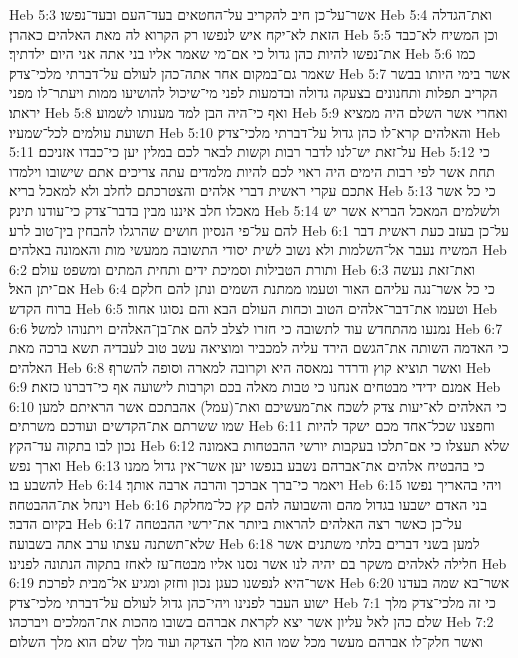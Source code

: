 Heb 5:3  אשר־על־כן חיב להקריב על־החטאים בעד־העם ובעד־נפשו׃
Heb 5:4  ואת־הגדלה הזאת לא־יקח איש לנפשו רק הקרוא לה מאת האלהים כאהרן׃
Heb 5:5  וכן המשיח לא־כבד את־נפשו להיות כהן גדול כי אם־מי שאמר אליו בני אתה אני היום ילדתיך׃
Heb 5:6  כמו שאמר גם־במקום אחר אתה־כהן לעולם על־דברתי מלכי־צדק׃
Heb 5:7  אשר בימי היותו בבשר הקריב תפלות ותחנונים בצעקה גדולה ובדמעות לפני מי־שיכול להושיעו ממות ויעתר־לו מפני יראתו׃
Heb 5:8  ואף כי־היה הבן למד מענותו לשמוע׃
Heb 5:9  ואחרי אשר השלם היה ממציא תשועת עולמים לכל־שמעיו׃
Heb 5:10  והאלהים קרא־לו כהן גדול על־דברתי מלכי־צדק׃
Heb 5:11  על־זאת יש־לנו לדבר רבות וקשות לבאר לכם במלין יען כי־כבדו אזניכם׃
Heb 5:12  כי תחת אשר לפי רבות הימים היה ראוי לכם להיות מלמדים עתה צריכים אתם שישובו וילמדו אתכם עקרי ראשית דברי אלהים והצטרכתם לחלב ולא למאכל בריא׃
Heb 5:13  כי כל אשר מאכלו חלב איננו מבין בדבר־צדק כי־עודנו תינק׃
Heb 5:14  ולשלמים המאכל הבריא אשר יש להם על־פי הנסיון חושים שהרגלו להבחין בין־טוב לרע׃
Heb 6:1  על־כן בעזב כעת ראשית דבר המשיח נעבר אל־השלמות ולא נשוב לשית יסודי התשובה ממעשי מות והאמונה באלהים׃
Heb 6:2  ותורת הטבילות וסמיכת ידים ותחית המתים ומשפט עולם׃
Heb 6:3  ואת־זאת נעשה אם־יתן האל׃
Heb 6:4  כי כל אשר־נגה עליהם האור וטעמו ממתנת השמים ונתן להם חלקם ברוח הקדש׃
Heb 6:5  וטעמו את־דבר־אלהים הטוב וכחות העולם הבא והם נסוגו אחור׃
Heb 6:6  נמנעו מהתחדש עוד לתשובה כי חזרו לצלב להם את־בן־האלהים ויתנוהו למשל׃
Heb 6:7  כי האדמה השותה את־הגשם הירד עליה למכביר ומוציאה עשב טוב לעבדיה תשא ברכה מאת האלהים׃
Heb 6:8  ואשר תוציא קוץ ודרדר נמאסה היא וקרובה למארה וסופה להשרף׃
Heb 6:9  אמנם ידידי מבטחים אנחנו כי טבות מאלה בכם וקרבות לישועה אף כי־דברנו כזאת׃
Heb 6:10  כי האלהים לא־יעות צדק לשכח את־מעשיכם ואת־(עמל) אהבתכם אשר הראיתם למען שמו ששרתם את־הקדשים ועודכם משרתים׃
Heb 6:11  וחפצנו שכל־אחד מכם ישקד להיות נכון לבו בתקוה עד־הקץ׃
Heb 6:12  שלא תעצלו כי אם־תלכו בעקבות יורשי ההבטחות באמונה וארך נפש׃
Heb 6:13  כי בהבטיח אלהים את־אברהם נשבע בנפשו יען אשר־אין גדול ממנו להשבע בו׃
Heb 6:14  ויאמר כי־ברך אברכך והרבה ארבה אותך׃
Heb 6:15  ויהי בהאריך נפשו וינחל את־ההבטחה׃
Heb 6:16  בני האדם ישבעו בגדול מהם והשבועה להם קץ כל־מחלקת בקיום הדבר׃
Heb 6:17  על־כן כאשר רצה האלהים להראות ביותר את־ירשי ההבטחה שלא־תשתנה עצתו ערב אתה בשבועה׃
Heb 6:18  למען בשני דברים בלתי משתנים אשר חלילה לאלהים משקר בם יהיה לנו אשר נסנו אליו מבטח־עז לאחז בתקוה הנתונה לפנינו׃
Heb 6:19  אשר־היא לנפשנו כעגן נכון וחזק ומגיע אל־מבית לפרכת׃
Heb 6:20  אשר־בא שמה בעדנו ישוע העבר לפנינו ויהי־כהן גדול לעולם על־דברתי מלכי־צדק׃
Heb 7:1  כי זה מלכי־צדק מלך שלם כהן לאל עליון אשר יצא לקראת אברהם בשובו מהכות את־המלכים ויברכהו׃
Heb 7:2  ואשר חלק־לו אברהם מעשר מכל שמו הוא מלך הצדקה ועוד מלך שלם הוא מלך השלום׃

